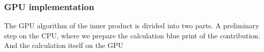 \documentclass[oribibl]{llncs2e/llncs}
\begin{document}

\subsubsection{GPU implementation}

The GPU algorithm of the inner product is divided into two parts. A preliminary step on the CPU,  where we prepare the calculation blue print of the  contribution. And the calculation itself on the GPU
\end{document}
